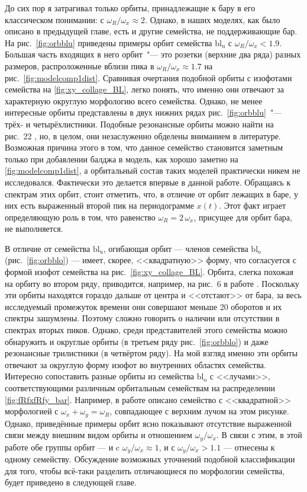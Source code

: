 \documentclass[tikz]{trlnotes}
\begin{document}
До сих пор я затрагивал только орбиты, принадлежащие к бару в его классическом понимании: с $ω_R/ω_x \approx 2$.
Однако, в наших моделях, как было описано в предыдущей главе, есть и другие семейства, не поддерживающие бар.
На рис.~\ref{fig:orbblu} приведены примеры орбит семейства $\text{bl}_{\text{u}}$ с $ω_R/ω_x < 1.9$. Большая часть 
входящих в него орбит~"--- это розетки (верхние два ряда) разных размеров, распроложенные вблизи пика в $ω_R/ω_x \approx 1.7$ на рис.~\ref{fig:modelcomp1dist}.
Сравнивая очертания подобной орбиты с изофотами семейства на \ref{fig:xy_collage_BL}, легко понять, что именно они отвечают
за характерную округлую морфологию всего семейства. Однако, не менее интересные орбиты представлены в двух нижних рядах рис.~\ref{fig:orbblu}~"--- трёх- и четырёхлистники. Подобные резонансные орбиты можно найти на рис.~22 \citet{voglis2007}, но, в целом, они незаслуженно обделены вниманием в литературе.
Возможная причина этого в том, что данное семейство становится заметным только при добавлении балджа в модель, как хорошо
заметно на \ref{fig:modelcomp1dist}, а орбитальный состав таких моделей практически никем не исследовался. Фактически это делается впервые в данной работе. 
Обращаясь к спектрам этих орбит, стоит отметить, что, в отличие от орбит лежащих в баре, у них есть выраженный второй пик на периодограмме $x(t)$. Этот факт играет определяющую роль в том, что  равенство $ω_R = 2\,ω_x$, присущее для орбит бара, не выполняется.

В отличие от семейства $\text{bl}_{\text{u}}$, огибающая орбит --- членов семейства $\text{bl}_{\text{o}}$ (рис.~\ref{fig:orbblo}) --- 
имеет, скорее, <<квадратную>> форму, что согласуется с формой изофот семейства на рис.~\ref{fig:xy_collage_BL}. Орбита, слегка похожая на орбиту во втором ряду, приводится, например, на рис.~6 в работе \cite{gajda2016}. Поскольку эти орбиты находятся
гораздо дальше от центра и <<отстают>> от бара, за весь исследуемый промежуток времени они совершают меньше 20 оборотов и их спектры зашумлены. Поэтому сложно говорить о наличии или отсутствии в спектрах вторых пиков. Однако, среди представителей этого семейства можно обнаружить и округлые орбиты (в третьем ряду рис.~\ref{fig:orbblo}) и даже резонансные трилистники (в четвёртом ряду). 
На мой взгляд именно эти орбиты отвечают за округлую форму изофот во внутренних областях семейства. 
Интересно сопоставить разные орбиты из семейства $\text{bl}_\text{o}$ с <<лучами>>, соответствующими различным орбитальным семействам на распределении \ref{fig:fRfxfRfy_bar}. 
Например, в работе \cite{gajda2016} описано семейство с <<квадратной>> морфологией с $ω_x + ω_y = ω_R$, совпадающее с верхним 
лучом на этом рисунке. Однако, приведённые примеры орбит ясно показывают отсутствие выраженной связи между внешним видом орбиты и отношением $ω_y/ω_x$.
В связи с этим, в этой работе обе группы орбит --- и c $ω_y/ω_x \approx 1$, и с $ω_y/ω_x > 1.1$ --- отнесены к одному семейству. 
Обсуждение возможных уточнений подобной классификации для того, 
чтобы всё-таки разделить отличающиеся по морфологии семейства, будет приведено в следующей главе.
\end{document}
